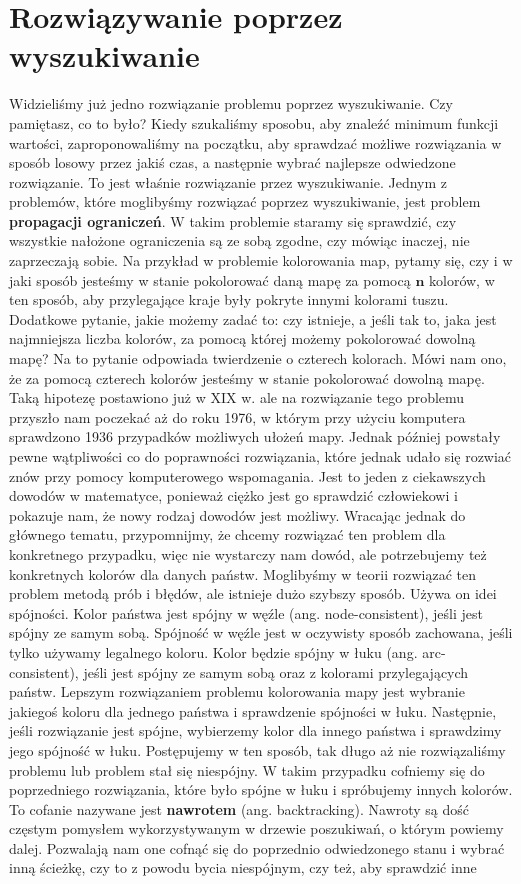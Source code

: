 \section{Rozwiązywanie poprzez wyszukiwanie}

Widzieliśmy już jedno rozwiązanie problemu poprzez wyszukiwanie. Czy pamiętasz, co to było? Kiedy szukaliśmy sposobu, aby znaleźć minimum funkcji wartości, zaproponowaliśmy na początku, aby sprawdzać możliwe rozwiązania w sposób losowy przez jakiś czas, a następnie wybrać najlepsze odwiedzone rozwiązanie. To jest właśnie rozwiązanie przez wyszukiwanie. Jednym z problemów, które moglibyśmy rozwiązać poprzez wyszukiwanie, jest problem \textbf{propagacji ograniczeń}. W takim problemie staramy się sprawdzić, czy wszystkie nałożone ograniczenia są ze sobą zgodne, czy mówiąc inaczej, nie zaprzeczają sobie. Na przykład w problemie kolorowania map, pytamy się, czy i w jaki sposób jesteśmy w stanie pokolorować daną mapę za pomocą $\boldsymbol{n}$ kolorów, w ten sposób, aby przylegające kraje były pokryte innymi kolorami tuszu. Dodatkowe pytanie, jakie możemy zadać to: czy istnieje, a jeśli tak to, jaka jest najmniejsza liczba kolorów, za pomocą której możemy pokolorować dowolną mapę? Na to pytanie odpowiada twierdzenie o czterech kolorach. Mówi nam ono, że za pomocą czterech kolorów jesteśmy w stanie pokolorować dowolną mapę. Taką hipotezę postawiono już w XIX w. ale na rozwiązanie tego problemu przyszło nam poczekać aż do roku 1976, w którym przy użyciu komputera sprawdzono 1936 przypadków możliwych ułożeń mapy. Jednak później powstały pewne wątpliwości co do poprawności rozwiązania, które jednak udało się rozwiać znów przy pomocy komputerowego wspomagania. Jest to jeden z ciekawszych dowodów w matematyce, ponieważ ciężko jest go sprawdzić człowiekowi i pokazuje nam, że nowy rodzaj dowodów jest możliwy. Wracając jednak do głównego tematu, przypomnijmy, że chcemy rozwiązać ten problem dla konkretnego przypadku, więc nie wystarczy nam dowód, ale potrzebujemy też konkretnych kolorów dla danych państw. Moglibyśmy w teorii rozwiązać ten problem metodą prób i błędów, ale istnieje dużo szybszy sposób. Używa on idei spójności. Kolor państwa jest spójny w węźle (ang. node-consistent), jeśli jest spójny ze samym sobą. Spójność w węźle jest w oczywisty sposób zachowana, jeśli tylko używamy legalnego koloru. Kolor będzie spójny w łuku (ang. arc-consistent), jeśli jest spójny ze samym sobą oraz z kolorami przylegających państw. Lepszym rozwiązaniem problemu kolorowania mapy jest wybranie jakiegoś koloru dla jednego państwa i sprawdzenie spójności w łuku. Następnie, jeśli rozwiązanie jest spójne, wybierzemy kolor dla innego państwa i sprawdzimy jego spójność w łuku. Postępujemy w ten sposób, tak długo aż nie rozwiązaliśmy problemu lub problem stał się niespójny. W takim przypadku cofniemy się do poprzedniego rozwiązania, które było spójne w łuku i spróbujemy innych kolorów. To cofanie nazywane jest \textbf{nawrotem} (ang. backtracking). Nawroty są dość częstym pomysłem wykorzystywanym w drzewie poszukiwań, o którym powiemy dalej. Pozwalają nam one cofnąć się do poprzednio odwiedzonego stanu i wybrać inną ścieżkę, czy to z powodu bycia niespójnym, czy też, aby sprawdzić inne 